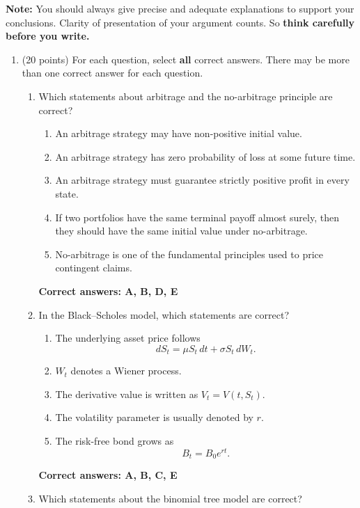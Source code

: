 \documentclass[a4paper,12pt]{article}
\begin{document}
{\bf Note:} You should always give precise and adequate explanations to support your
conclusions.  Clarity of presentation of your argument counts.  So {\bf think carefully before you
write.}

\newpage
\baselineskip=22pt  %


\bigskip

\begin{enumerate} 
\item (20 points) For each question, select \textbf{all} correct answers.  
There may be more than one correct answer for each question.
\begin{enumerate}[label=(\arabic*)]
\item Which statements about arbitrage and the no-arbitrage principle are correct?
\begin{enumerate}[label=\Alph*.]
    \item An arbitrage strategy may have non-positive initial value.
    \item An arbitrage strategy has zero probability of loss at some future time.
    \item An arbitrage strategy must guarantee strictly positive profit in every state.
    \item If two portfolios have the same terminal payoff almost surely, then they should have the same initial value under no-arbitrage.
    \item No-arbitrage is one of the fundamental principles used to price contingent claims.
\end{enumerate}

\textbf{Correct answers: A, B, D, E}
\item In the Black--Scholes model, which statements are correct?

\begin{enumerate}[label=\Alph*.]
    \item The underlying asset price follows
    \[
    dS_t=\mu S_t\,dt+\sigma S_t\,dW_t.
    \]
    \item \(W_t\) denotes a Wiener process.
    \item The derivative value is written as \(V_t=V(t,S_t)\).
    \item The volatility parameter is usually denoted by \(r\).
    \item The risk-free bond grows as
    \[
    B_t=B_0e^{rt}.
    \]
\end{enumerate}

\textbf{Correct answers: A, B, C, E}
\item Which statements about the binomial tree model are correct?


\end{enumerate}
\end{enumerate}
\end{document}
